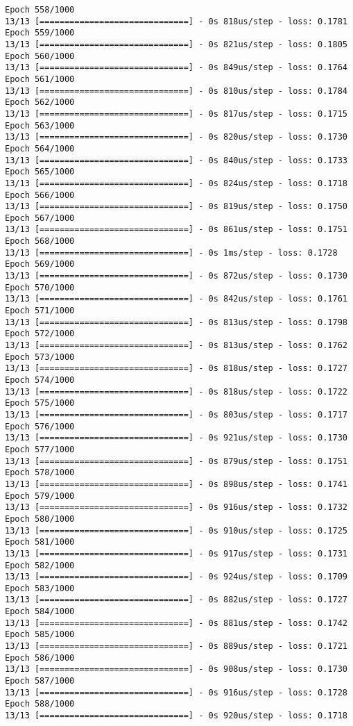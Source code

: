 \documentclass[11pt]{article}
\begin{document}
\begin{Verbatim}[commandchars=\\\{\}]
Epoch 558/1000
13/13 [==============================] - 0s 818us/step - loss: 0.1781
Epoch 559/1000
13/13 [==============================] - 0s 821us/step - loss: 0.1805
Epoch 560/1000
13/13 [==============================] - 0s 849us/step - loss: 0.1764
Epoch 561/1000
13/13 [==============================] - 0s 810us/step - loss: 0.1784
Epoch 562/1000
13/13 [==============================] - 0s 817us/step - loss: 0.1715
Epoch 563/1000
13/13 [==============================] - 0s 820us/step - loss: 0.1730
Epoch 564/1000
13/13 [==============================] - 0s 840us/step - loss: 0.1733
Epoch 565/1000
13/13 [==============================] - 0s 824us/step - loss: 0.1718
Epoch 566/1000
13/13 [==============================] - 0s 819us/step - loss: 0.1750
Epoch 567/1000
13/13 [==============================] - 0s 861us/step - loss: 0.1751
Epoch 568/1000
13/13 [==============================] - 0s 1ms/step - loss: 0.1728
Epoch 569/1000
13/13 [==============================] - 0s 872us/step - loss: 0.1730
Epoch 570/1000
13/13 [==============================] - 0s 842us/step - loss: 0.1761
Epoch 571/1000
13/13 [==============================] - 0s 813us/step - loss: 0.1798
Epoch 572/1000
13/13 [==============================] - 0s 813us/step - loss: 0.1762
Epoch 573/1000
13/13 [==============================] - 0s 818us/step - loss: 0.1727
Epoch 574/1000
13/13 [==============================] - 0s 818us/step - loss: 0.1722
Epoch 575/1000
13/13 [==============================] - 0s 803us/step - loss: 0.1717
Epoch 576/1000
13/13 [==============================] - 0s 921us/step - loss: 0.1730
Epoch 577/1000
13/13 [==============================] - 0s 879us/step - loss: 0.1751
Epoch 578/1000
13/13 [==============================] - 0s 898us/step - loss: 0.1741
Epoch 579/1000
13/13 [==============================] - 0s 916us/step - loss: 0.1732
Epoch 580/1000
13/13 [==============================] - 0s 910us/step - loss: 0.1725
Epoch 581/1000
13/13 [==============================] - 0s 917us/step - loss: 0.1731
Epoch 582/1000
13/13 [==============================] - 0s 924us/step - loss: 0.1709
Epoch 583/1000
13/13 [==============================] - 0s 882us/step - loss: 0.1727
Epoch 584/1000
13/13 [==============================] - 0s 881us/step - loss: 0.1742
Epoch 585/1000
13/13 [==============================] - 0s 889us/step - loss: 0.1721
Epoch 586/1000
13/13 [==============================] - 0s 908us/step - loss: 0.1730
Epoch 587/1000
13/13 [==============================] - 0s 916us/step - loss: 0.1728
Epoch 588/1000
13/13 [==============================] - 0s 920us/step - loss: 0.1718

\end{Verbatim}
\end{document}
